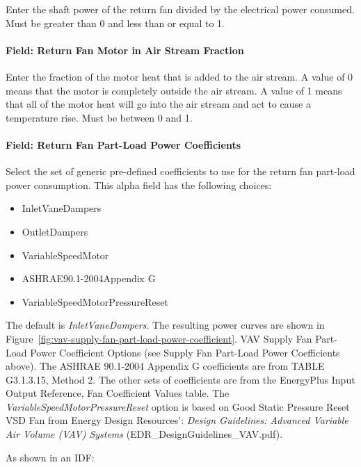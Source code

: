 Enter the shaft power of the return fan divided by the electrical power consumed. Must be greater than 0 and less than or equal to 1.

\paragraph{Field: Return Fan Motor in Air Stream Fraction}\label{field-return-fan-motor-in-air-stream-fraction-3}

Enter the fraction of the motor heat that is added to the air stream. A value of 0 means that the motor is completely outside the air stream. A value of 1 means that all of the motor heat will go into the air stream and act to cause a temperature rise. Must be between 0 and 1.

\paragraph{Field: Return Fan Part-Load Power Coefficients}\label{field-return-fan-part-load-power-coefficients}

Select the set of generic pre-defined coefficients to use for the return fan part-load power consumption. This alpha field has the following choices:

\begin{itemize}
\item
  InletVaneDampers
\item
  OutletDampers
\item
  VariableSpeedMotor
\item
  ASHRAE90.1-2004Appendix G
\item
  VariableSpeedMotorPressureReset
\end{itemize}

The default is \emph{InletVaneDampers}. The resulting power curves are shown in Figure~\ref{fig:vav-supply-fan-part-load-power-coefficient}. VAV Supply Fan Part-Load Power Coefficient Options (see Supply Fan Part-Load Power Coefficients above). The ASHRAE 90.1-2004 Appendix G coefficients are from TABLE G3.1.3.15, Method 2. The other sets of coefficients are from the EnergyPlus Input Output Reference, Fan Coefficient Values table. The \emph{VariableSpeedMotorPressureReset} option is based on Good Static Pressure Reset VSD Fan from Energy Design Resources': \emph{Design Guidelines: Advanced Variable Air Volume (VAV) Systems} (EDR\_DesignGuidelines\_VAV.pdf).

As shown in an IDF:

